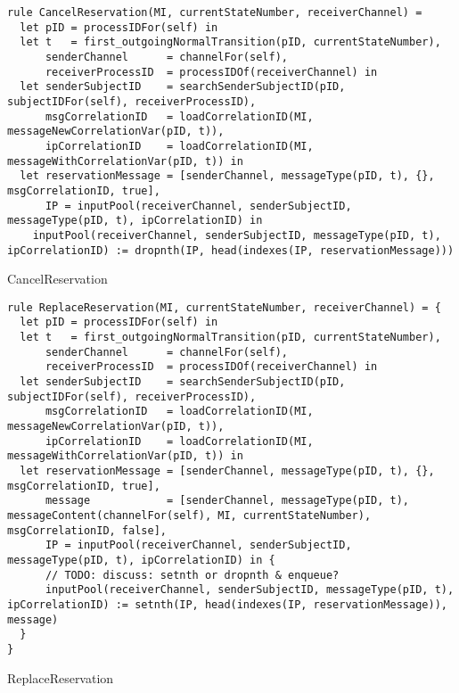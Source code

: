 \begin{listing}[H]
\begin{verbatim}
rule CancelReservation(MI, currentStateNumber, receiverChannel) =
  let pID = processIDFor(self) in
  let t   = first_outgoingNormalTransition(pID, currentStateNumber),
      senderChannel      = channelFor(self),
      receiverProcessID  = processIDOf(receiverChannel) in
  let senderSubjectID    = searchSenderSubjectID(pID, subjectIDFor(self), receiverProcessID),
      msgCorrelationID   = loadCorrelationID(MI, messageNewCorrelationVar(pID, t)),
      ipCorrelationID    = loadCorrelationID(MI, messageWithCorrelationVar(pID, t)) in
  let reservationMessage = [senderChannel, messageType(pID, t), {}, msgCorrelationID, true],
      IP = inputPool(receiverChannel, senderSubjectID, messageType(pID, t), ipCorrelationID) in
    inputPool(receiverChannel, senderSubjectID, messageType(pID, t), ipCorrelationID) := dropnth(IP, head(indexes(IP, reservationMessage)))
\end{verbatim}
\caption{CancelReservation}
\label{lst:asm:CancelReservation}
\end{listing}




\begin{listing}[H]
\begin{verbatim}
rule ReplaceReservation(MI, currentStateNumber, receiverChannel) = {
  let pID = processIDFor(self) in
  let t   = first_outgoingNormalTransition(pID, currentStateNumber),
      senderChannel      = channelFor(self),
      receiverProcessID  = processIDOf(receiverChannel) in
  let senderSubjectID    = searchSenderSubjectID(pID, subjectIDFor(self), receiverProcessID),
      msgCorrelationID   = loadCorrelationID(MI, messageNewCorrelationVar(pID, t)),
      ipCorrelationID    = loadCorrelationID(MI, messageWithCorrelationVar(pID, t)) in
  let reservationMessage = [senderChannel, messageType(pID, t), {}, msgCorrelationID, true],
      message            = [senderChannel, messageType(pID, t), messageContent(channelFor(self), MI, currentStateNumber), msgCorrelationID, false],
      IP = inputPool(receiverChannel, senderSubjectID, messageType(pID, t), ipCorrelationID) in {
      // TODO: discuss: setnth or dropnth & enqueue?
      inputPool(receiverChannel, senderSubjectID, messageType(pID, t), ipCorrelationID) := setnth(IP, head(indexes(IP, reservationMessage)), message)
  }
}
\end{verbatim}
\caption{ReplaceReservation}
\label{lst:asm:ReplaceReservation}
\end{listing}





